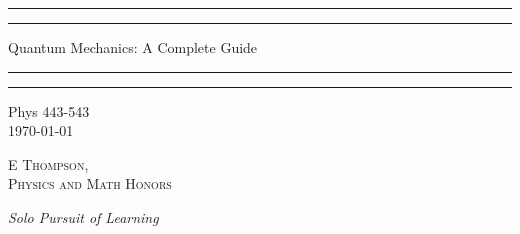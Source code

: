 \documentclass[12pt, a4paper, oneside, openright, titlepage]{book}
\begin{document}

\begin{titlepage}
    \centering
    \scshape
    \vspace*{\baselineskip}
    \rule{\textwidth}{1.6pt}\vspace*{-\baselineskip}\vspace*{2pt}
    \rule{\textwidth}{0.4pt}
    
    \vspace{0.75\baselineskip}
    
    {\LARGE Quantum Mechanics: A Complete Guide}
    
    \vspace{0.75\baselineskip}
    
    \rule{\textwidth}{0.4pt}\vspace*{-\baselineskip}\vspace{3.2pt}
    \rule{\textwidth}{1.6pt}
    
    \vspace{2\baselineskip}
    Phys 443-543 \\
    \vspace*{3\baselineskip}
    \monthdayyeardate\today \\
    \vspace*{5.0\baselineskip}
    
    {\scshape\Large E Thompson, \\ Physics and Math Honors\\}
    
    \vspace{1.0\baselineskip}
    \textit{Solo Pursuit of Learning}
    \vfill
    \enlargethispage{1in}
    \begin{figure}[b!]
    \end{figure}
\end{titlepage}
\end{document}
